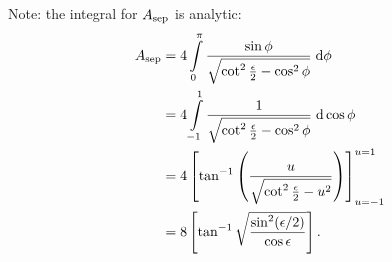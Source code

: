 \documentclass[11pt,
        usenames, %
        dvipsnames %
    ]{article}
\newcommand*{\p}[1]{\left(#1\right)}
\newcommand*{\s}[1]{\left[#1\right]}
\begin{document}
Note: the integral for $A_{\rm sep}$ is analytic:
\begin{align}
    A_{\rm sep} &= 4\int\limits_0^\pi
            \frac{\sin\phi}{\sqrt{\cot^2\frac{\epsilon}{2} - \cos^2\phi}}
            \;\mathrm{d}\phi\nonumber\\
        &= 4\int\limits_{-1}^1
            \frac{1}{\sqrt{\cot^2\frac{\epsilon}{2} - \cos^2\phi}}
            \;\mathrm{d}\cos \phi\nonumber\\
        &= 4\s{\tan^{-1}\p{\frac{u}{
            \sqrt{\cot^2\frac{\epsilon}{2} - u^2}}}}_{u=-1}^{u=1}\nonumber\\
        &= 8\s{\tan^{-1}\sqrt{\frac{\sin^2(\epsilon / 2)}{\cos \epsilon}}}.
\end{align}
\end{document}
